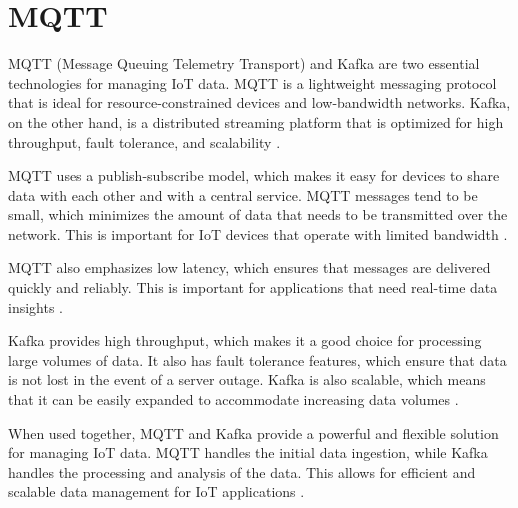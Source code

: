 \section{MQTT}
\label{cha:mqtt}

MQTT (Message Queuing Telemetry Transport) and Kafka are two essential technologies for managing IoT data. MQTT is a lightweight messaging protocol that is ideal for resource-constrained devices and low-bandwidth networks. Kafka, on the other hand, is a distributed streaming platform that is optimized for high throughput, fault tolerance, and scalability \cite{hugo2020bridging}.

MQTT uses a publish-subscribe model, which makes it easy for devices to share data with each other and with a central service. MQTT messages tend to be small, which minimizes the amount of data that needs to be transmitted over the network. This is important for IoT devices that operate with limited bandwidth \cite{al2020investigating}.

MQTT also emphasizes low latency, which ensures that messages are delivered quickly and reliably. This is important for applications that need real-time data insights \cite{al2020investigating}.

Kafka provides high throughput, which makes it a good choice for processing large volumes of data. It also has fault tolerance features, which ensure that data is not lost in the event of a server outage. Kafka is also scalable, which means that it can be easily expanded to accommodate increasing data volumes \cite{shapira2021kafka}.

When used together, MQTT and Kafka provide a powerful and flexible solution for managing IoT data. MQTT handles the initial data ingestion, while Kafka handles the processing and analysis of the data. This allows for efficient and scalable data management for IoT applications \cite{hugo2020bridging}.